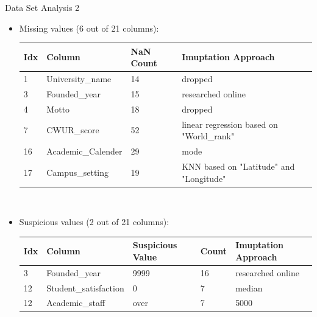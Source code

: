 \documentclass[xcolor=table]{beamer} %
\begin{document}
\begin{frame}{Data Set Analysis 2}
  \vspace{-1cm}
  \begin{itemize}
  \item Missing values (6 out of 21 columns):
    \begin{table}[h]
      \centering
      \tiny
      \begin{tabular}{l|l|l|l}
        Idx & Column             & NaN Count & Imuptation Approach \\
        \hline
        1   & University\_name   & 14        & dropped \\
        3   & Founded\_year      & 15        & researched online \\
        4   & Motto              & 18        & dropped \\
        7   & CWUR\_score        & 52        & linear regression based on "World\_rank" \\
        16  & Academic\_Calender & 29        & mode \\
        17  & Campus\_setting    & 19        & KNN based on "Latitude" and "Longitude"
      \end{tabular}\hfill\
      \label{tab:missing_values_nan}
    \end{table}
  \item Suspicious values (2 out of 21 columns):
    \begin{table}[h]
      \centering
      \tiny
      \begin{tabular}{l|l|l|l|l}
        Idx & Column                & Suspicious Value & Count & Imuptation Approach \\
        \hline
        3   & Founded\_year         & 9999             & 16    & researched online \\
        12  & Student\_satisfaction & 0                & 7     & median \\
        12  & Academic\_staff       & over             & 7     & 5000 \\
      \end{tabular}\hfill\
      \label{tab:missing_values_zero}
    \end{table}
  \end{itemize}
\end{frame}
\end{document}
